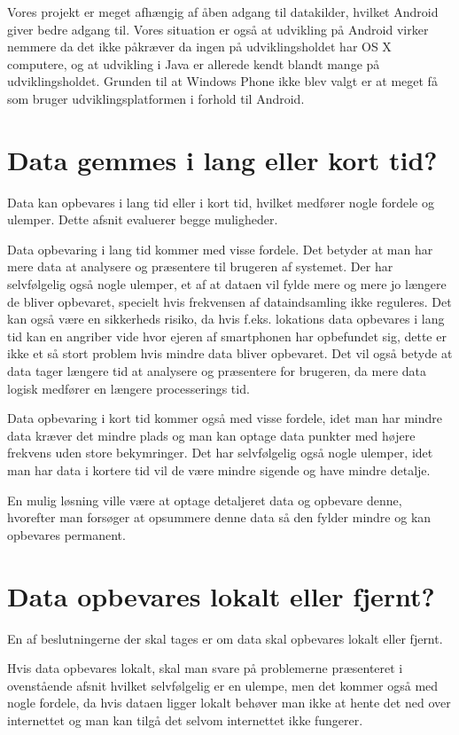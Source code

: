 Vores projekt er meget afhængig af åben adgang til datakilder, hvilket Android giver bedre adgang til. Vores situation er også at udvikling på Android virker nemmere da det ikke påkræver da ingen på udviklingsholdet har OS X computere, og at udvikling i Java er allerede kendt blandt mange på udviklingsholdet. Grunden til at Windows Phone ikke blev valgt er at meget få som bruger udviklingsplatformen i forhold til Android.

\section{Data gemmes i lang eller kort tid?}
Data kan opbevares i lang tid eller i kort tid, hvilket medfører nogle fordele og ulemper. Dette afsnit evaluerer begge muligheder.

Data opbevaring i lang tid kommer med visse fordele. Det betyder at man har mere data at analysere og præsentere til brugeren af systemet.  
Der har selvfølgelig også nogle ulemper, et af at dataen vil fylde mere og mere jo længere de bliver opbevaret, specielt hvis frekvensen af dataindsamling ikke reguleres. Det kan også være en sikkerheds risiko, da hvis f.eks. lokations data opbevares i lang tid kan en angriber vide hvor ejeren af smartphonen har opbefundet sig, dette er ikke et så stort problem hvis mindre data bliver opbevaret. Det vil også betyde at data tager længere tid at analysere og præsentere for brugeren, da mere data logisk medfører en længere processerings tid.

Data opbevaring i kort tid kommer også med visse fordele, idet man har mindre data kræver det mindre plads og man kan optage data punkter med højere frekvens uden store bekymringer. %
Det har selvfølgelig også nogle ulemper, idet man har data i kortere tid vil de være mindre sigende og have mindre detalje. %

En mulig løsning ville være at optage detaljeret data og opbevare denne, hvorefter man forsøger at opsummere denne data så den fylder mindre og kan opbevares permanent. %

\section{Data opbevares lokalt eller fjernt?}
En af beslutningerne der skal tages er om data skal opbevares lokalt eller fjernt. 

Hvis data opbevares lokalt, skal man svare på problemerne præsenteret i ovenstående afsnit hvilket selvfølgelig er en ulempe, men det kommer også med nogle fordele, da hvis dataen ligger lokalt behøver man ikke at hente det ned over internettet og man kan tilgå det selvom internettet ikke fungerer.

